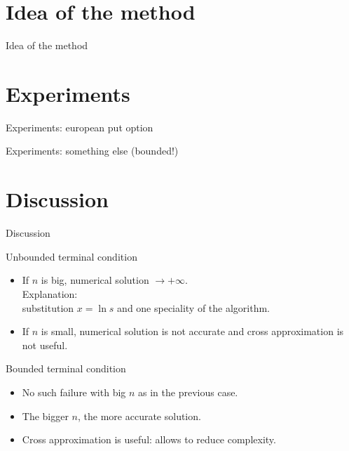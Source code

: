 \documentclass{beamer}
\theoremstyle{definition}
\theoremstyle{plain}
\theoremstyle{remark}
\begin{document}
	\section{Idea of the method}
		\begin{frame}{Idea of the method}
		 
		\end{frame}
		

	\section{Experiments}
		\begin{frame}{Experiments: european put option}
		 
		\end{frame}

		\begin{frame}{Experiments: something else (bounded!)}
		 
		\end{frame}

	\section{Discussion}

		\begin{frame}{Discussion}
			\vspace{-7pt}
			\begin{block}{Unbounded terminal condition}
				\begin{itemize}
					\item If $n$ is big, numerical solution $\rightarrow +\infty$.\\
					Explanation: \\substitution $x = \ln s$ and one speciality of the algorithm.
					\item If $n$ is small, numerical solution is not accurate and cross approximation is not useful.
				\end{itemize}
			\end{block}
			\vspace{-3pt}
			\begin{block}{Bounded terminal condition}
				\begin{itemize}
					\item No such failure with big $n$ as in the previous case.
					\item The bigger $n$, the more accurate solution.
					\item Cross approximation is useful: allows to reduce complexity.
				\end{itemize}
			\end{block}
		\end{frame}
	
	\section*{}

		\begin{frame}{}
		\end{frame}
\end{document}
